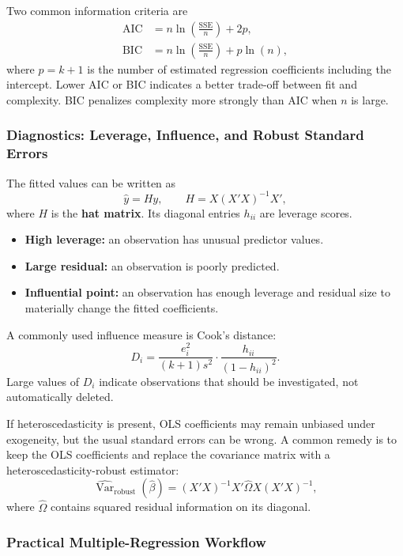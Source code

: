\documentclass[12pt,openany]{book}
\begin{document}
Two common information criteria are
\begin{align*}
\text{AIC} &= n\ln\left(\frac{\text{SSE}}{n}\right)+2p,\\
\text{BIC} &= n\ln\left(\frac{\text{SSE}}{n}\right)+p\ln(n),
\end{align*}
where \(p=k+1\) is the number of estimated regression coefficients including the intercept. Lower AIC or BIC indicates a better trade-off between fit and complexity. BIC penalizes complexity more strongly than AIC when \(n\) is large.

\subsubsection{Diagnostics: Leverage, Influence, and Robust Standard Errors}

The fitted values can be written as
\[
\hat{y}=Hy, \qquad H=X(X'X)^{-1}X',
\]
where \(H\) is the \textbf{hat matrix}. Its diagonal entries \(h_{ii}\) are leverage scores.
\begin{itemize}[leftmargin=*]
    \item \textbf{High leverage:} an observation has unusual predictor values.
    \item \textbf{Large residual:} an observation is poorly predicted.
    \item \textbf{Influential point:} an observation has enough leverage and residual size to materially change the fitted coefficients.
\end{itemize}

A commonly used influence measure is Cook's distance:
\[
D_i=\frac{e_i^2}{(k+1)s^2}\cdot\frac{h_{ii}}{(1-h_{ii})^2}.
\]
Large values of \(D_i\) indicate observations that should be investigated, not automatically deleted.

If heteroscedasticity is present, OLS coefficients may remain unbiased under exogeneity, but the usual standard errors can be wrong. A common remedy is to keep the OLS coefficients and replace the covariance matrix with a heteroscedasticity-robust estimator:
\[
\widehat{\operatorname{Var}}_{\text{robust}}(\hat{\beta})=(X'X)^{-1}X'\widehat{\Omega}X(X'X)^{-1},
\]
where \(\widehat{\Omega}\) contains squared residual information on its diagonal.

\subsubsection{Practical Multiple-Regression Workflow}
\end{document}
